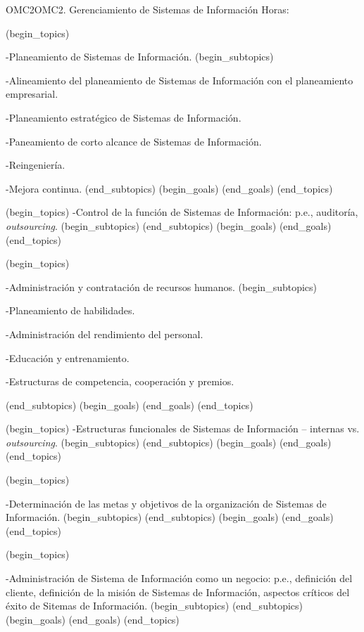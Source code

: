 \begin{BKL2}{OMC2}{OMC2. Gerenciamiento de Sistemas de Información}
Horas:
 
(begin_topics)

-Planeamiento de Sistemas de Información.
(begin_subtopics)

-Alineamiento del planeamiento de Sistemas de Información con el planeamiento empresarial.

-Planeamiento estratégico de Sistemas de Información.

-Paneamiento de corto alcance de Sistemas de Información.

-Reingeniería.

-Mejora continua.
(end_subtopics)
(begin_goals)
(end_goals)
(end_topics)

 

(begin_topics)
-Control de la función de Sistemas de Información: p.e., auditoría, {\it outsourcing}.
(begin_subtopics)
(end_subtopics)
(begin_goals)
(end_goals)
(end_topics)

 

(begin_topics)

-Administración y contratación de recursos humanos.
(begin_subtopics)

-Planeamiento de habilidades.

-Administración del rendimiento del personal.

-Educación y entrenamiento.

-Estructuras de competencia, cooperación y premios.

(end_subtopics)
(begin_goals)
(end_goals)
(end_topics)

 

(begin_topics)
-Estructuras funcionales de Sistemas de Información -- internas vs. {\it outsourcing}.
(begin_subtopics)
(end_subtopics)
(begin_goals)
(end_goals)
(end_topics)

 

(begin_topics)

-Determinación de las metas y objetivos de la organización de Sistemas de Información.
(begin_subtopics)
(end_subtopics)
(begin_goals)
(end_goals)
(end_topics)

 

(begin_topics)

-Administración de Sistema de Información como un negocio: p.e., definición del cliente, definición de la misión de Sistemas de Información, aspectos críticos del éxito de Sitemas de Información.
(begin_subtopics)
(end_subtopics)
(begin_goals)
(end_goals)
(end_topics)


\end{BKL2}
